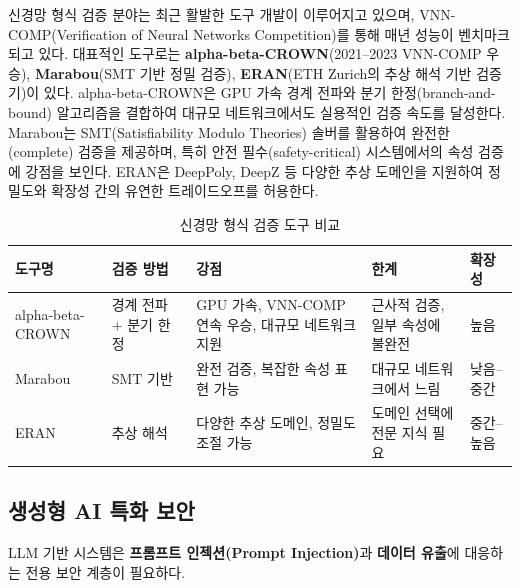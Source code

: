 신경망 형식 검증 분야는 최근 활발한 도구 개발이 이루어지고 있으며, VNN-COMP(Verification of Neural Networks Competition)를 통해 매년 성능이 벤치마크되고 있다. 대표적인 도구로는 \textbf{alpha-beta-CROWN}(2021--2023 VNN-COMP 우승), \textbf{Marabou}(SMT 기반 정밀 검증), \textbf{ERAN}(ETH Zurich의 추상 해석 기반 검증기)이 있다. alpha-beta-CROWN은 GPU 가속 경계 전파와 분기 한정(branch-and-bound) 알고리즘을 결합하여 대규모 네트워크에서도 실용적인 검증 속도를 달성한다. Marabou는 SMT(Satisfiability Modulo Theories) 솔버를 활용하여 완전한(complete) 검증을 제공하며, 특히 안전 필수(safety-critical) 시스템에서의 속성 검증에 강점을 보인다. ERAN은 DeepPoly, DeepZ 등 다양한 추상 도메인을 지원하여 정밀도와 확장성 간의 유연한 트레이드오프를 허용한다.

\begin{table}[htbp]
\centering
\caption{신경망 형식 검증 도구 비교}
\label{tab:verification_tools}
\begin{tabularx}{\textwidth}{p{2.5cm}p{2.5cm}XXp{2cm}}
\toprule
\textbf{도구명} & \textbf{검증 방법} & \textbf{강점} & \textbf{한계} & \textbf{확장성} \\
\midrule
alpha-beta-CROWN & 경계 전파 + 분기 한정 & GPU 가속, VNN-COMP 연속 우승, 대규모 네트워크 지원 & 근사적 검증, 일부 속성에 불완전 & 높음 \\
Marabou & SMT 기반 & 완전 검증, 복잡한 속성 표현 가능 & 대규모 네트워크에서 느림 & 낮음--중간 \\
ERAN & 추상 해석 & 다양한 추상 도메인, 정밀도 조절 가능 & 도메인 선택에 전문 지식 필요 & 중간--높음 \\
\bottomrule
\end{tabularx}
\end{table}

\subsection{생성형 AI 특화 보안}
\label{sec:15.1.4}

LLM 기반 시스템은 \textbf{프롬프트 인젝션(Prompt Injection)}과 \textbf{데이터 유출}에 대응하는 전용 보안 계층이 필요하다.

